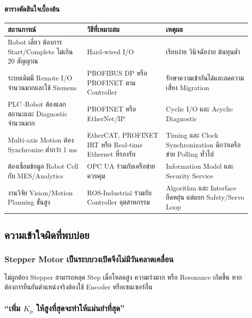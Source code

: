 \paragraph{ตารางตัดสินใจเบื้องต้น}

\begin{table}[htbp]
    \centering
    \small
    \begin{tabularx}{\textwidth}{@{}X L{0.28\textwidth} X@{}}
        \hline
        \textbf{สถานการณ์} & \textbf{วิธีที่เหมาะสม} & \textbf{เหตุผล} \\
        \hline
        Robot เดี่ยว ต้องการ Start/Complete ไม่เกิน 20 สัญญาณ & Hard-wired I/O & เรียบง่าย วินิจฉัยง่าย ต้นทุนต่ำ \\
        ระบบเดิมมี Remote I/O จำนวนมากและใช้ Siemens & PROFIBUS DP หรือ PROFINET ตาม Controller & รักษาความเข้ากันได้และลดความเสี่ยง Migration \\
        PLC–Robot ต้องแลกสถานะและ Diagnostic จำนวนมาก & PROFINET หรือ EtherNet/IP & Cyclic I/O และ Acyclic Diagnostic \\
        Multi-axis Motion ต้อง Synchronize ต่ำกว่า 1 ms & EtherCAT, PROFINET IRT หรือ Real-time Ethernet ที่รองรับ & Timing และ Clock Synchronization ดีกว่าเครือข่าย Polling ทั่วไป \\
        ต้องเชื่อมข้อมูล Robot Cell กับ MES/Analytics & OPC UA ร่วมกับเครือข่ายควบคุม & Information Model และ Security Service \\
        งานวิจัย Vision/Motion Planning ขั้นสูง & ROS-Industrial ร่วมกับ Controller อุตสาหกรรม & Algorithm และ Interface ยืดหยุ่น แต่แยก Safety/Servo Loop \\
        \hline
    \end{tabularx}
\end{table}



\subsection{ความเข้าใจผิดที่พบบ่อย}

\subsubsection{Stepper Motor เป็นระบบวงเปิดจึงไม่มีวันคลาดเคลื่อน}

ไม่ถูกต้อง Stepper สามารถหลุด Step เมื่อโหลดสูง ความเร่งมาก หรือ Resonance เกิดขึ้น หากต้องการยืนยันตำแหน่งจริงต้องใช้ Encoder หรือเซนเซอร์อื่น

\subsubsection{\texorpdfstring{ “เพิ่ม $K_p$ ให้สูงที่สุดจะทำให้แม่นยำที่สุด”}{8.2 เพิ่ม Kp ให้สูงที่สุดจะทำให้แม่นยำที่สุด}}

